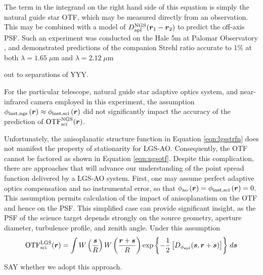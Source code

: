 The term in the integrand on the right hand side of this equation is
simply the natural guide star OTF, which may be measured
directly from an observation.  This may be combined with a model of
$D^{\rm NGS}_{\rm apl}(\boldsymbol{r}_{1} - \boldsymbol{r}_{2})$ to
predict the off-axis PSF.  Such an experiment was
conducted on the Hale 5m at Palomar Observatory
\cite{Britton:2006}, and demonstrated predictions of the
companion Strehl ratio accurate to 1\% at both $\lambda=1.65\;\mu$m and
$\lambda=2.12\;\mu$m
\begin{notes}
out to separations of YYY.
\end{notes}
For the particular telescope, natural guide star adaptive optics
system, and near-infrared camera employed in this experiment, the
assumption $\phi_{\rm inst,ngs}\left(\boldsymbol{r}\right) \approx
\phi_{\rm inst,sci}\left(\boldsymbol{r}\right)$ did not significantly
impact the accuracy of the prediction of ${\rm OTF}^{\rm NGS}_{\rm
  sci}(\boldsymbol{r})$.

Unfortunately, the anisoplanatic structure function in Equation
\ref{eqn:lgsstrfn} does not manifest the property of stationarity for LGS-AO.  
Consequently, the OTF cannot be factored as shown in Equation
\ref{eqn:ngsotf}.  Despite this complication, there are approaches that
will advance our understanding of the point spread function delivered
by a LGS-AO system.  First, one may assume
perfect adaptive optics compensation and no instrumental error, so
that $\phi_{\rm ao}\left(\boldsymbol{r}\right) = 
\phi_{\rm inst,sci}\left(\boldsymbol{r}\right) = 0$.  This assumption permits
calculation of the impact of anisoplanatism on the OTF 
and hence on the PSF. This simplified case
can provide significant insight, as the PSF of the science target depends
strongly on the source geometry, aperture diameter, turbulence
profile, and zenith angle.  Under this assumption
\begin{equation}\label{eqn:lgsotfa}
\begin{aligned}
{\rm OTF}^{\rm LGS}_{\rm sci}(\boldsymbol{r}) = 
\int 
W \left( \frac{\boldsymbol{s}}{R} \right)
W \left( \frac{\boldsymbol{r} + \boldsymbol{s}}{R} \right) 
\exp{\left\{ -\frac{1}{2} \left[
D_{\rm \phi_{apl}}(\boldsymbol{s}, \boldsymbol{r} + \boldsymbol{s})
\right] \right\}}
\; d\boldsymbol{s} 
\end{aligned}
\end{equation}
\begin{notes}
SAY whether we adopt this approach.
\end{notes}


